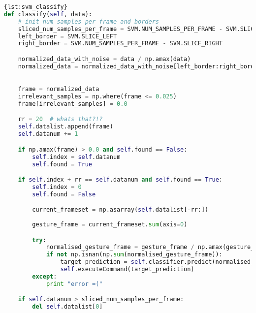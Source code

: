 \begin{lstlisting}[language=Python,caption={Classify},label={lst:svm_classify}]{lst:svm_classify}
def classify(self, data):
	# init num samples per frame and borders
	sliced_num_samples_per_frame = SVM.NUM_SAMPLES_PER_FRAME - SVM.SLICE_RIGHT - SVM.SLICE_RIGHT
	left_border = SVM.SLICE_LEFT
	right_border = SVM.NUM_SAMPLES_PER_FRAME - SVM.SLICE_RIGHT

	normalized_data_with_noise = data / np.amax(data)
	normalized_data = normalized_data_with_noise[left_border:right_border] - self.noise_frame[
																			 left_border:right_border]

	frame = normalized_data
	irrelevant_samples = np.where(frame <= 0.025)
	frame[irrelevant_samples] = 0.0

	rr = 20  # whats that?!?
	self.datalist.append(frame)
	self.datanum += 1

	if np.amax(frame) > 0.0 and self.found == False:
		self.index = self.datanum
		self.found = True

	if self.index + rr == self.datanum and self.found == True:
		self.index = 0
		self.found = False

		current_frameset = np.asarray(self.datalist[-rr:])
	
		gesture_frame = current_frameset.sum(axis=0)

		try:
			normalised_gesture_frame = gesture_frame / np.amax(gesture_frame)
			if not np.isnan(np.sum(normalised_gesture_frame)):
				target_prediction = self.classifier.predict(normalised_gesture_frame[::2])[0]  # only each second?!?
				self.executeCommand(target_prediction)
		except:
			print "error =("

	if self.datanum > sliced_num_samples_per_frame:
		del self.datalist[0]
\end{lstlisting}


